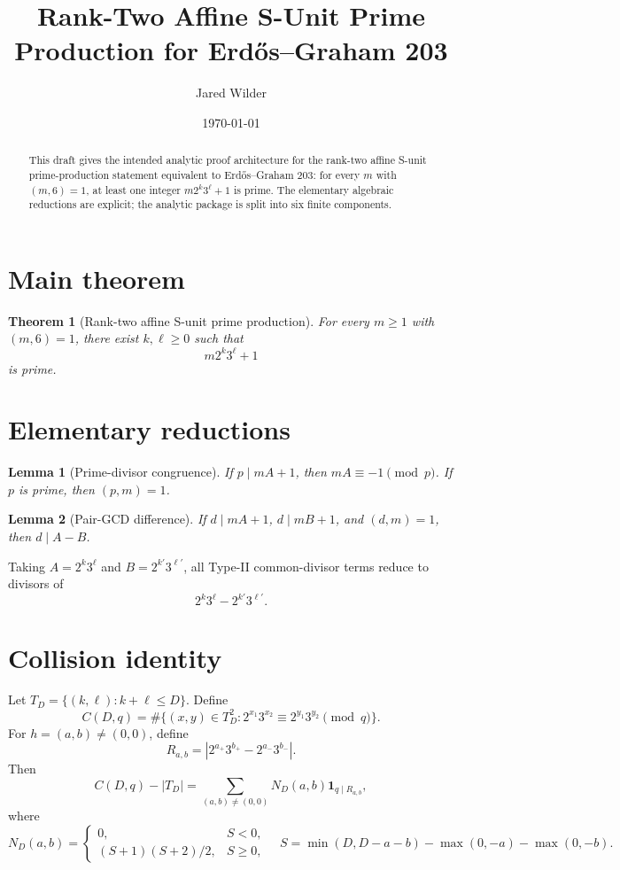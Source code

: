 \documentclass[11pt]{article}
\title{Rank-Two Affine S-Unit Prime Production for Erdős--Graham 203}
\author{Jared Wilder}
\date{\today}
\newtheorem{theorem}{Theorem}
\newtheorem{lemma}{Lemma}
\begin{document}
\maketitle

\begin{abstract}
This draft gives the intended analytic proof architecture for the rank-two
affine S-unit prime-production statement equivalent to Erdős--Graham 203:
for every \(m\) with \((m,6)=1\), at least one integer \(m2^k3^\ell+1\) is
prime.  The elementary algebraic reductions are explicit; the analytic package
is split into six finite components.
\end{abstract}

\section{Main theorem}

\begin{theorem}[Rank-two affine S-unit prime production]
For every \(m\ge 1\) with \((m,6)=1\), there exist \(k,\ell\ge0\) such that
\[
m2^k3^\ell+1
\]
is prime.
\end{theorem}

\section{Elementary reductions}

\begin{lemma}[Prime-divisor congruence]
If \(p\mid mA+1\), then \(mA\equiv-1\pmod p\).  If \(p\) is prime, then
\((p,m)=1\).
\end{lemma}

\begin{lemma}[Pair-GCD difference]
If \(d\mid mA+1\), \(d\mid mB+1\), and \((d,m)=1\), then \(d\mid A-B\).
\end{lemma}

Taking \(A=2^k3^\ell\) and \(B=2^{k'}3^{\ell'}\), all Type-II common-divisor
terms reduce to divisors of
\[
2^k3^\ell-2^{k'}3^{\ell'}.
\]

\section{Collision identity}

Let \(T_D=\{(k,\ell):k+\ell\le D\}\).  Define
\[
C(D,q)=\#\{(x,y)\in T_D^2:2^{x_1}3^{x_2}\equiv2^{y_1}3^{y_2}\pmod q\}.
\]
For \(h=(a,b)\ne(0,0)\), define
\[
R_{a,b}=\left|2^{a_+}3^{b_+}-2^{a_-}3^{b_-}\right|.
\]
Then
\[
C(D,q)-|T_D|
=
\sum_{(a,b)\ne(0,0)}N_D(a,b)\mathbf 1_{q\mid R_{a,b}},
\]
where
\[
N_D(a,b)=
\begin{cases}
0,&S<0,\\
(S+1)(S+2)/2,&S\ge0,
\end{cases}
\quad
S=\min(D,D-a-b)-\max(0,-a)-\max(0,-b).
\]
\end{document}
